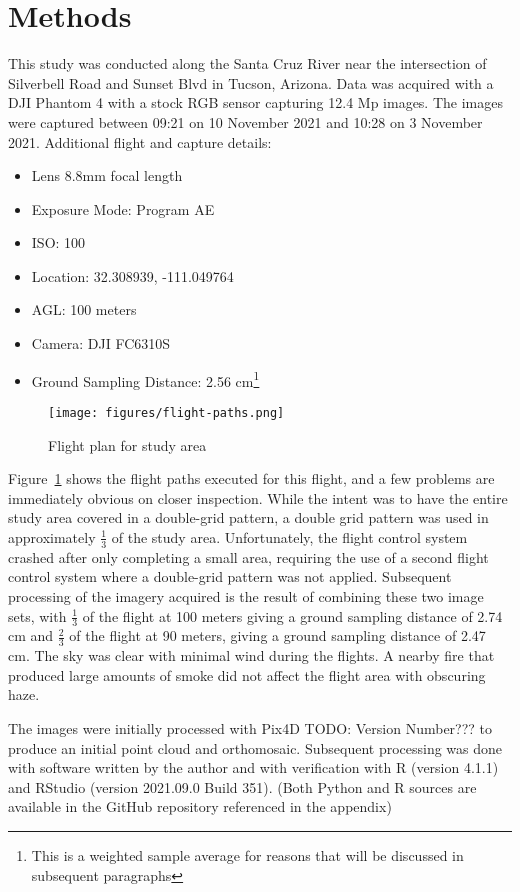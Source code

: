 \documentclass[letterpaper]{article}
\begin{document}
\section{Methods}
This study was conducted along the Santa Cruz River near the intersection of Silverbell Road and Sunset Blvd in Tucson, Arizona. Data was acquired with a DJI Phantom 4 with a stock RGB sensor capturing 12.4 Mp images. The images were captured between 09:21 on 10 November 2021 and 10:28 on 3 November 2021. Additional flight and capture details:
\begin{itemize}
\item Lens 8.8mm focal length
\item Exposure Mode: Program AE
\item ISO: 100
\item Location: 32.308939, -111.049764
\item AGL: 100 meters
\item Camera: DJI FC6310S
\item Ground Sampling Distance: 2.56 cm\footnote{This is a weighted sample average for reasons that will be discussed in subsequent paragraphs}
\end{itemize}


\begin{figure}[H]
\centering
  \texttt{[image: figures/flight-paths.png]} 
  \caption{Flight plan for study area}
  \label{fig:flight} 
\end{figure}

Figure~\ref{fig:flight} shows the flight paths executed for this flight, and a few problems are immediately obvious on closer inspection. While the intent was to have the entire study area covered in a double-grid pattern, a double grid pattern was used in approximately $\frac {1} {3}$ of the study area. Unfortunately, the flight control system crashed after only completing a small area, requiring the use of a second flight control system where a double-grid pattern was not applied. Subsequent processing of the imagery acquired is the result of combining these two image sets, with $\frac {1} {3}$ of the flight at 100 meters giving a ground sampling distance of 2.74 cm and $\frac {2} {3}$ of the flight at 90 meters, giving a ground sampling distance of 2.47 cm. The sky was clear with minimal wind during the flights. A nearby fire that produced large amounts of smoke did not affect the flight area with obscuring haze.

The images were initially processed with Pix4D TODO: Version Number??? to produce an initial point cloud and orthomosaic. Subsequent processing was done with software written by the author and with verification with R (version 4.1.1) and RStudio (version 2021.09.0 Build 351). (Both Python and R sources are available in the GitHub repository referenced in the appendix)
\end{document}
